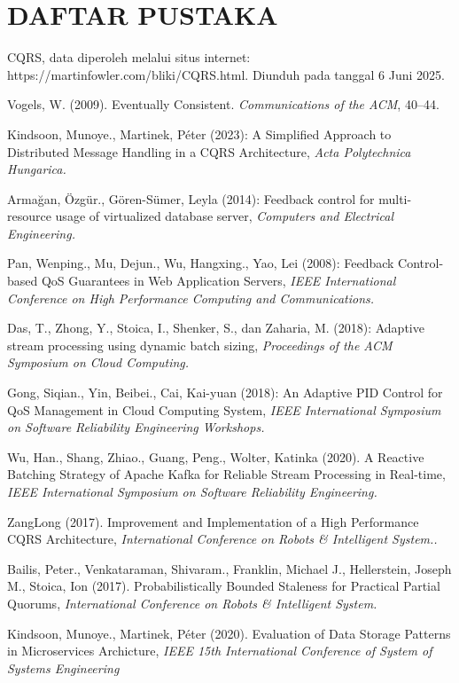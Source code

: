 
\chapter*{DAFTAR PUSTAKA}

\noindent CQRS, data diperoleh melalui situs internet: https://martinfowler.com/bliki/CQRS.html. Diunduh pada tanggal 6 Juni 2025.

\noindent Vogels, W. (2009). Eventually Consistent. \emph{Communications of the ACM}, 40--44.

\noindent Kindsoon, Munoye., Martinek, Péter (2023): A Simplified Approach to Distributed Message Handling in a CQRS Architecture, \emph{Acta Polytechnica Hungarica.}

\noindent Armağan, Özgür., Gören-Sümer, Leyla (2014): Feedback control for multi-resource usage of virtualized database server, \emph{Computers and Electrical Engineering.}

\noindent Pan, Wenping., Mu, Dejun., Wu, Hangxing., Yao, Lei (2008): Feedback Control-based QoS Guarantees in Web Application Servers, \emph{IEEE International Conference on High Performance Computing and Communications.}

\noindent Das, T., Zhong, Y., Stoica, I., Shenker, S., dan Zaharia, M. (2018): Adaptive stream processing using dynamic batch sizing, \emph{Proceedings of the ACM Symposium on Cloud Computing.}

\noindent Gong, Siqian., Yin, Beibei., Cai, Kai-yuan (2018): An Adaptive PID Control for QoS Management in Cloud Computing System, \emph{IEEE International Symposium on Software Reliability Engineering Workshops.}

\noindent Wu, Han., Shang, Zhiao., Guang, Peng., Wolter, Katinka (2020). A Reactive Batching Strategy of Apache Kafka for Reliable Stream Processing in Real-time, \emph{IEEE International Symposium on Software Reliability Engineering.}

\noindent ZangLong (2017). Improvement and Implementation of a High Performance CQRS Architecture, \emph{International Conference on Robots \& Intelligent System..}

\noindent Bailis, Peter., Venkataraman, Shivaram., Franklin, Michael J., Hellerstein, Joseph M., Stoica, Ion (2017). Probabilistically Bounded Staleness for Practical Partial Quorums, \emph{International Conference on Robots \& Intelligent System.}

\noindent Kindsoon, Munoye., Martinek, Péter (2020). Evaluation of Data Storage Patterns in Microservices Archicture, \emph{IEEE 15th International Conference of System of Systems Engineering}

